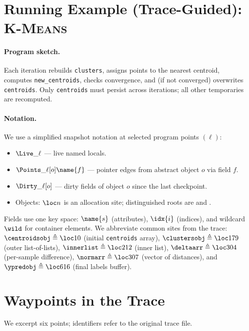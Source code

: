 
\clearpage
\section{Running Example (Trace-Guided): \textsc{K-Means}}

\paragraph{Program sketch.}
Each iteration rebuilds \texttt{clusters}, assigns points to the nearest centroid, computes \texttt{new\_centroids}, checks convergence, and (if not converged) overwrites \texttt{centroids}.
Only \texttt{centroids} must persist across iterations; all other temporaries are recomputed.

\paragraph{Notation.}
We use a simplified snapshot notation at selected program points $(\ell)$:
\begin{itemize}
\item $\Live\_\ell$ --- live named locals.
\item $\Points\_\ell[o]\name{f}$ --- pointer edges from abstract object $o$ via field $f$.
\item $\Dirty\_\ell[o]$ --- dirty fields of object $o$ since the last checkpoint.
\item Objects: $\loc n$ is an allocation site; distinguished roots are \LOCALS{} and \GLOBALS{}.
\end{itemize}
Fields use one key space: $\name{s}$ (attributes), $\idx{i}$ (indices), and wildcard $\wild$ for container elements.
We abbreviate common sites from the trace: $\centroidsobj \triangleq \loc 10$ (initial \texttt{centroids} array), $\clustersobj \triangleq \loc 179$ (outer list-of-lists), $\innerlist \triangleq \loc 212$ (inner list), $\deltaarr \triangleq \loc 304$ (per-sample difference), $\normarr \triangleq \loc 307$ (vector of distances), and $\ypredobj \triangleq \loc 616$ (final labels buffer).

\section*{Waypoints in the Trace}
We excerpt six points; identifiers refer to the original trace file.

